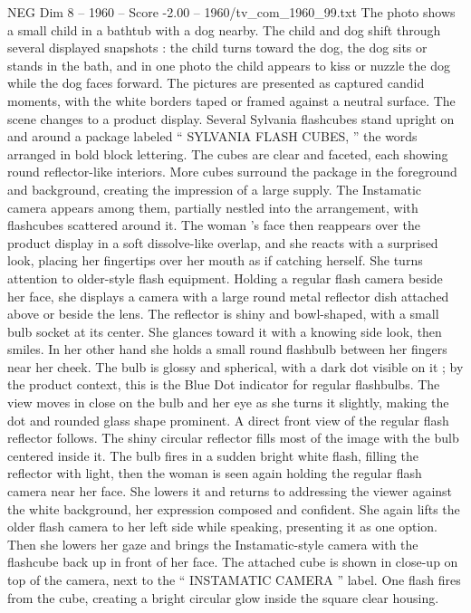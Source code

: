 \begin{textsample}{NEG Dim 8 – 1960 – Score -2.00 – 1960/tv\_com\_1960\_99.txt}
The photo shows a small child in a bathtub with a dog nearby.
The child and dog shift through several displayed snapshots : the child turns toward the dog, the dog sits or stands in the bath, and in one photo the child appears to kiss or nuzzle the dog while the dog faces forward.
The pictures are presented as captured candid moments, with the white borders taped or framed against a neutral surface.
The scene changes to a product display.
Several Sylvania flashcubes stand upright on and around a package labeled “ SYLVANIA FLASH CUBES, ” the words arranged in bold block lettering.
The cubes are clear and faceted, each showing round reflector-like interiors.
More cubes surround the package in the foreground and background, creating the impression of a large supply.
The Instamatic camera appears among them, partially nestled into the arrangement, with flashcubes scattered around it.
The woman ’s face then reappears over the product display in a soft dissolve-like overlap, and she reacts with a surprised look, placing her fingertips over her mouth as if catching herself.
She turns attention to older-style flash equipment.
Holding a regular flash camera beside her face, she displays a camera with a large round metal reflector dish attached above or beside the lens.
The reflector is shiny and bowl-shaped, with a small bulb socket at its center.
She glances toward it with a knowing side look, then smiles.
In her other hand she holds a small round flashbulb between her fingers near her cheek.
The bulb is glossy and spherical, with a dark dot visible on it ; by the product context, this is the Blue Dot indicator for regular flashbulbs.
The view moves in close on the bulb and her eye as she turns it slightly, making the dot and rounded glass shape prominent.
A direct front view of the regular flash reflector follows.
The shiny circular reflector fills most of the image with the bulb centered inside it.
The bulb fires in a sudden bright white flash, filling the reflector with light, then the woman is seen again holding the regular flash camera near her face.
She lowers it and returns to addressing the viewer against the white background, her expression composed and confident.
She again lifts the older flash camera to her left side while speaking, presenting it as one option.
Then she lowers her gaze and brings the Instamatic-style camera with the flashcube back up in front of her face.
The attached cube is shown in close-up on top of the camera, next to the “ INSTAMATIC CAMERA ” label.
One flash fires from the cube, creating a bright circular glow inside the square clear housing.

\end{textsample}

